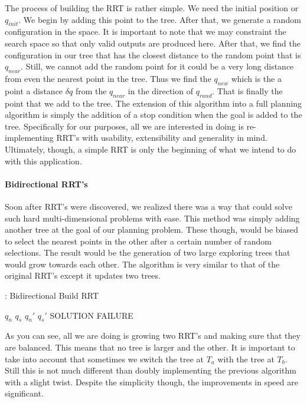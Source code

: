 \documentclass[titlepage]{article}
\begin{document}
The process of building the RRT is rather simple. We need the initial position or $q_{init}$. We begin by adding this point to the tree. After that, we generate a random configuration in the space. It is important to note that we may constraint the search space so that only valid outputs are produced here. After that, we find the configuration in our tree that has the closest distance to the random point that is $q_{near}$. Still, we cannot add the random point for it could be a very long distance from even the nearest point in the tree. Thus we find the $q_{new}$ which is the a point a distance $\delta q$ from the $q_{near}$ in the direction of $q_{rand}$. That is finally the point that we add to the tree. The extension of this algorithm into a full planning algorithm is simply the addition of a stop condition when the goal is added to the tree.
Specifically for our purposes, all we are interested in doing is re-implementing RRT's with usability, extensibility and generality in mind. Ultimately, though, a simple RRT is only the beginning of what we intend to do with this application.
\paragraph{Bidirectional RRT's}
Soon after RRT's were discovered, we realized there was a way that could solve such hard multi-dimensional problems with ease. This method was simply adding another tree at the goal of our planning problem. These though, would be biased to select the nearest points in the other after a certain number of random selections. The result would be the generation of two large exploring trees that would grow towards each other. The algorithm is very similar to that of the original RRT's except it updates two trees.
\begin{algorithm}[H]
\caption{: Bidirectional Build RRT}
\begin{algorithmic}
\State $q_{n}$ \gets {}
\State $q_{s}$ \gets {}
\State {}
\State {}
\State $q_{n}'$ \gets {}
\State $q_{s}'$ \gets {}
\State {}
\State {}
\State \Return SOLUTION
\EndIf
{}
\State {}
\EndIf
\EndIf
\EndIf
\EndFor
\State \Return FAILURE
\EndFunction
\end{algorithmic}
\end{algorithm}
As you can see, all we are doing is growing two RRT's and making sure that they are balanced. This means that no tree is larger and the other. It is important to take into account that sometimes we switch the tree at $T_{a}$ with the tree at $T_{b}$. Still this is not much different than doubly implementing the previous algorithm with a slight twist. Despite the simplicity though, the improvements in speed are significant.
\end{document}
